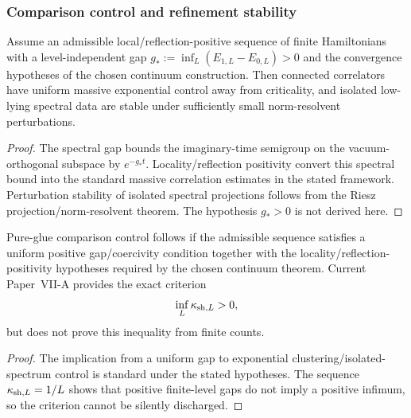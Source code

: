 \documentclass[12pt,a4paper]{article}
\begin{document}
\subsubsection{Comparison control and refinement stability}
\label{p11:subsec:comparison-control-refinement-stability}

\begin{theorem}
\label{p11:thm:post-gap-finite-carrier-control}

Assume an admissible local/reflection-positive sequence of finite Hamiltonians with a level-independent gap \(g_*:=\inf_L(E_{1,L}-E_{0,L})>0\) and the convergence hypotheses of the chosen continuum construction.  Then connected correlators have uniform massive exponential control away from criticality, and isolated low-lying spectral data are stable under sufficiently small norm-resolvent perturbations.
\label{p11:eq:uniform-comparison-gap-condition}
\label{p11:eq:uniform-gap-comparison-corrections}
\end{theorem}
\begin{proof}

The spectral gap bounds the imaginary-time semigroup on the vacuum-orthogonal subspace by \(e^{-g_*t}\).  Locality/reflection positivity convert this spectral bound into the standard massive correlation estimates in the stated framework.  Perturbation stability of isolated spectral projections follows from the Riesz projection/norm-resolvent theorem.  The hypothesis \(g_*>0\) is not derived here.
\end{proof}

\begin{corollary}
\label{p11:cor:native-pure-glue-comparison-control-derived}

Pure-glue comparison control follows if the admissible sequence satisfies a uniform positive gap/coercivity condition together with the locality/reflection-positivity hypotheses required by the chosen continuum theorem.  Current Paper~VII-A provides the exact criterion
\[
\inf_L\kappa_{{\rm sh},L}>0,
\]
but does not prove this inequality from finite counts.

\end{corollary}
\begin{proof}

The implication from a uniform gap to exponential clustering/isolated-spectrum control is standard under the stated hypotheses.  The sequence \(\kappa_{{\rm sh},L}=1/L\) shows that positive finite-level gaps do not imply a positive infimum, so the criterion cannot be silently discharged.
\end{proof}
\end{document}
